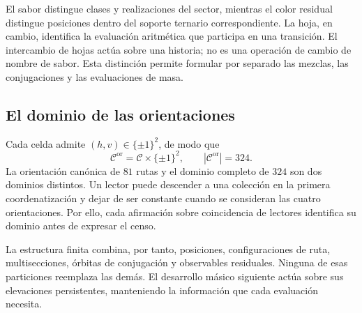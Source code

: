 El sabor distingue clases y realizaciones del sector, mientras el color
residual distingue posiciones dentro del soporte ternario correspondiente.
La hoja, en cambio, identifica la evaluación aritmética que participa en
una transición. El intercambio de hojas actúa sobre una historia; no es
una operación de cambio de nombre de sabor. Esta distinción permite
formular por separado las mezclas, las conjugaciones y las evaluaciones
de masa.

\subsection{El dominio de las orientaciones}

Cada celda admite \((h,v)\in\{\pm1\}^2\), de modo que
\[
 \mathcal C^{\mathrm{or}}=\mathcal C\times\{\pm1\}^2,
 \qquad |\mathcal C^{\mathrm{or}}|=324.
\]
La orientación canónica de \(81\) rutas y el dominio completo de \(324\)
son dos dominios distintos. Un lector puede descender a una colección en la
primera coordenatización y dejar de ser constante cuando se consideran las cuatro
orientaciones. Por ello, cada afirmación sobre coincidencia de lectores
identifica su dominio antes de expresar el censo.

La estructura finita combina, por tanto, posiciones, configuraciones de ruta,
multisecciones, órbitas de conjugación y observables residuales. Ninguna
de esas particiones reemplaza las demás. El desarrollo másico siguiente
actúa sobre sus elevaciones persistentes, manteniendo la información que
cada evaluación necesita.
